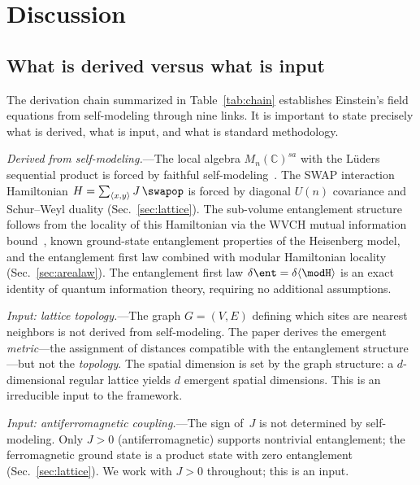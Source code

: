 \section{Discussion}
\label{sec:discussion}

\subsection{What is derived versus what is input}
\label{sec:derived-vs-input}

The derivation chain summarized in Table~\ref{tab:chain} establishes
Einstein's field equations from self-modeling through nine links.  It is
important to state precisely what is derived, what is input, and what is
standard methodology.

\emph{Derived from self-modeling.}---The local algebra
$M_n(\mathbb{C})^{sa}$ with the L\"uders sequential product is forced by
faithful self-modeling~\cite{Paper5}. The SWAP interaction Hamiltonian
$H = \sum_{\langle x,y\rangle} J\,\swapop$ is forced by diagonal $U(n)$
covariance and Schur--Weyl duality (Sec.~\ref{sec:lattice}).  The
sub-volume entanglement structure follows from the locality of this
Hamiltonian via the WVCH mutual information
bound~\cite{WVCH2008}, known ground-state entanglement properties of the
Heisenberg model, and the entanglement first law combined with modular
Hamiltonian locality
(Sec.~\ref{sec:arealaw}).  The entanglement first law
$\delta\ent = \delta\langle\modH\rangle$ is an exact identity of quantum
information theory, requiring no additional assumptions.

\emph{Input: lattice topology.}---The graph $G = (V, E)$ defining which
sites are nearest neighbors is not derived from self-modeling.  The paper
derives the emergent \emph{metric}---the assignment of distances
compatible with the entanglement structure---but not the
\emph{topology}.  The spatial dimension is set by the graph structure:
a $d$-dimensional regular lattice yields $d$ emergent spatial dimensions.
This is an irreducible input to the framework.

\emph{Input: antiferromagnetic coupling.}---The sign of~$J$ is not
determined by self-modeling.  Only $J > 0$ (antiferromagnetic) supports
nontrivial entanglement; the ferromagnetic ground state is a product
state with zero entanglement (Sec.~\ref{sec:lattice}).  We work with
$J > 0$ throughout; this is an input.

